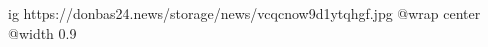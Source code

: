  
 
 
 
 

\ifcmt
  ig https://donbas24.news/storage/news/vcqcnow9d1ytqhgf.jpg
  @wrap center
  @width 0.9
\fi
